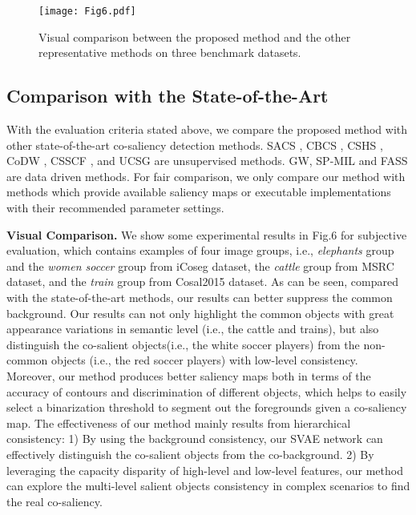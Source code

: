 \documentclass[sigconf]{acmart}
\begin{document}
\begin{figure}[!h]
\centering
\texttt{[image: Fig6.pdf]}
\caption{Visual comparison between the proposed method and the other representative methods on three benchmark datasets.}
\vspace{-5pt}
\label{fig:label}
\end{figure}

\subsection {Comparison with the State-of-the-Art}
With the evaluation criteria stated above, we compare the proposed method with other state-of-the-art co-saliency detection methods. SACS \cite{Cao2014}, CBCS \cite{Fu2013}, CSHS \cite{liu2014co},  CoDW \cite{Zhang2016}, CSSCF \cite{DBLP:journals/tmm/JerripothulaCY16}, and UCSG\cite{DBLP:conf/eccv/HsuTLQC18} are unsupervised methods. GW\cite{DBLP:conf/ijcai/WeiZBLW17}, SP-MIL \cite{zhang2017co} and FASS\cite{DBLP:conf/mm/ZhengZZ18} are data driven methods. For fair comparison, we only compare our method with methods which provide available saliency maps or executable implementations with their recommended parameter settings.

\noindent \textbf{Visual Comparison.} We show some experimental results in Fig.6 for subjective evaluation, which contains examples of four image groups, i.e., \textit{elephants} group and the\textit{ women soccer} group from iCoseg dataset, the\textit{ cattle} group from MSRC dataset, and the \textit{train} group from Cosal2015 dataset. As can be seen, compared with the state-of-the-art methods, our results can better suppress the common background. Our results can not only highlight the common objects with great appearance variations in semantic level (i.e., the cattle and trains), but also distinguish the co-salient objects(i.e., the white soccer players) from the non-common objects (i.e., the red soccer players) with low-level consistency. Moreover, our  method  produces better saliency maps both in terms of the accuracy of contours and discrimination of different objects, which helps to easily select a binarization threshold to segment out the foregrounds given a co-saliency map. The effectiveness of our method mainly results from hierarchical consistency: 1) By using the background consistency, our SVAE network can effectively distinguish the co-salient objects from the co-background. 2) By leveraging the capacity disparity of high-level and low-level features, our method can explore the multi-level salient objects consistency in complex scenarios to find the real co-saliency.
\end{document}
